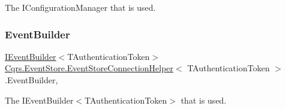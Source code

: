 The I\+Configuration\+Manager that is used. 

\mbox{\label{classCqrs_1_1EventStore_1_1EventStoreConnectionHelper_a0658657c13dd7edfaca4837e39fd86dd_a0658657c13dd7edfaca4837e39fd86dd}} 
\subsubsection{\texorpdfstring{Event\+Builder}{EventBuilder}}
{\footnotesize\ttfamily \hyperlink{interfaceCqrs_1_1EventStore_1_1IEventBuilder}{I\+Event\+Builder}$<$T\+Authentication\+Token$>$ \hyperlink{classCqrs_1_1EventStore_1_1EventStoreConnectionHelper}{Cqrs.\+Event\+Store.\+Event\+Store\+Connection\+Helper}$<$ T\+Authentication\+Token $>$.Event\+Builder\hspace{0.3cm}{\ttfamily [get]}, {\ttfamily [protected]}}



The I\+Event\+Builder$<$\+T\+Authentication\+Token$>$ that is used. 

